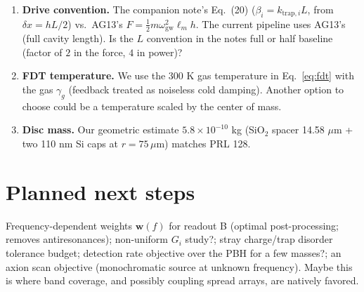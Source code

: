 \documentclass[11pt]{article}
\begin{document}
\begin{enumerate}[label=\textbf{Q\arabic*.},ref=\arabic*,leftmargin=3em]
  antinode positions), or is there a known non-uniform profile? A
  non-uniform hardwired profile is the one regime where coupling could
  also matter for readout A (mechanically re-aligning modes with the
  fixed weights).
\item \label{q:drive} \textbf{Drive convention.} The companion note's
  Eq.~(20) ($\beta_i = k_{\mathrm{trap},i}L$, from $\delta x = hL/2$)
  vs.\ AG13's $F = \frac12 m\omega_{\mathrm{gw}}^2 \ell_m h$. 
  The current pipeline uses AG13's (full cavity length). Is the $L$
  convention in the notes full or half baseline (factor of $2$ in the force,
  $4$ in power)?
\item \label{q:temp} \textbf{FDT temperature.} We use the 300 K gas
  temperature in Eq.~\eqref{eq:fdt} with the gas $\gamma_g$ (feedback
  treated as noiseless cold damping). Another option to choose could
  be a temperature scaled by the center of mass. 
\item \label{q:mass} \textbf{Disc mass.} Our geometric estimate
  $5.8\times10^{-10}$ kg (SiO$_2$ spacer 14.58 $\mu$m + two 110 nm Si
  caps at $r = 75\,\mu$m) matches PRL 128.
\end{enumerate}

\section*{Planned next steps}
Frequency-dependent weights $\mathbf{w}(f)$ for readout B 
(optimal post-processing; removes antiresonances); non-uniform $G_i$
study?; stray charge/trap disorder tolerance
budget; detection rate objective over the PBH for a few masses?; an
axion scan objective (monochromatic source at unknown frequency). Maybe
this is where band coverage, and possibly coupling spread
arrays, are natively favored.
\end{document}
